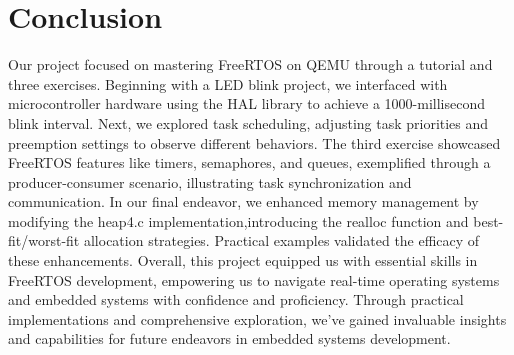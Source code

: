 \section*{Conclusion}

Our project focused on mastering FreeRTOS on QEMU through a tutorial and three exercises. 
Beginning with a LED blink project, we interfaced with microcontroller hardware using the HAL library to achieve a 1000-millisecond blink interval.
Next, we explored task scheduling, adjusting task priorities and preemption settings to observe different behaviors. 
The third exercise showcased FreeRTOS features like timers, semaphores, and queues, exemplified through a producer-consumer scenario, illustrating task synchronization and communication. 
In our final endeavor, we enhanced memory management by modifying the heap4.c implementation,introducing the realloc function and best-fit/worst-fit allocation strategies. 
Practical examples validated the efficacy of these enhancements. Overall, this project equipped us with essential skills in FreeRTOS development, empowering us to navigate real-time operating systems and embedded systems with confidence and proficiency.
Through practical implementations and comprehensive exploration, we've gained invaluable insights and capabilities for future endeavors in embedded systems development.
